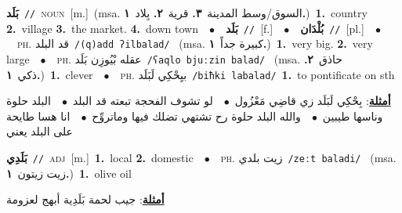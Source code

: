 \documentclass[10pt,a4paper,twoside]{article} %
\begin{document}
\begin{multicols}{2}
{\setlength\topsep{0pt}\textbf{\foreignlanguage{arabic}{بَلَد}}\ {\color{gray}\texttt{//}\color{black}}\ \textsc{noun}\ [m.]\ \color{gray}(msa. \foreignlanguage{arabic}{السوق/وسط المدينة}~\foreignlanguage{arabic}{\textbf{٣.}}  \foreignlanguage{arabic}{قرية}~\foreignlanguage{arabic}{\textbf{٢.}}  \foreignlanguage{arabic}{بِلاد}~\foreignlanguage{arabic}{\textbf{١.}})\color{black}\ \textbf{1.}~country  \textbf{2.}~village  \textbf{3.}~the market.  \textbf{4.}~down town\ \ $\bullet$\ \ \setlength\topsep{0pt}\textbf{\foreignlanguage{arabic}{بَلَد}}\ {\color{gray}\texttt{//}\color{black}}\ [f.]\ \ $\bullet$\ \ \setlength\topsep{0pt}\textbf{\foreignlanguage{arabic}{بُلْدَان}}\ {\color{gray}\texttt{//}\color{black}}\ [pl.]\ \ $\bullet$\ \ \textsc{ph.} \color{gray} \foreignlanguage{arabic}{قد البلد}\color{black}\ {\color{gray}\texttt{/{\sffamily (q)add ʔilbalad}/}\color{black}}\ \color{gray} (msa. \foreignlanguage{arabic}{كبيرة جداً}~\foreignlanguage{arabic}{\textbf{١.}})\color{black}\ \textbf{1.}~very big.  \textbf{2.}~very large\ \ $\bullet$\ \ \textsc{ph.} \color{gray} \foreignlanguage{arabic}{عقله بْيُوزِن بَلَد}\color{black}\ {\color{gray}\texttt{/{\sffamily ʕaqlo bjuːzin balad}/}\color{black}}\ \color{gray} (msa. \foreignlanguage{arabic}{حاذق}~\foreignlanguage{arabic}{\textbf{٢.}}  \foreignlanguage{arabic}{ذكي}~\foreignlanguage{arabic}{\textbf{١.}})\color{black}\ \textbf{1.}~clever\ \ $\bullet$\ \ \textsc{ph.} \color{gray} \foreignlanguage{arabic}{بيِحْكِي لَبَلَد}\color{black}\ {\color{gray}\texttt{/{\sffamily biħki labalad}/}\color{black}}\ \textbf{1.}~to pontificate on sth\  \begin{flushright}\color{gray}\foreignlanguage{arabic}{\textbf{\underline{\foreignlanguage{arabic}{أمثلة}}}: بِحْكِي لَبَلَد زي قاضِي مَعْزُول\ $\bullet$\ \  لو تشوف الفحجة تبعته قد البلد\ $\bullet$\ \  البلد حلوة وناسها طيبين\ $\bullet$\ \  والله البلد حلوة رح تشتهي تضلك فيها وماتروِّح\ $\bullet$\ \  انا هسا طايحة على البلد يعني}\end{flushright}\color{black}} \vspace{2mm}

{\setlength\topsep{0pt}\textbf{\foreignlanguage{arabic}{بَلَدِي}}\ {\color{gray}\texttt{//}\color{black}}\ \textsc{adj}\ [m.]\ \textbf{1.}~local  \textbf{2.}~domestic\ \ $\bullet$\ \ \textsc{ph.} \color{gray} \foreignlanguage{arabic}{زيت بلدي}\color{black}\ {\color{gray}\texttt{/{\sffamily zeːt baladi}/}\color{black}}\ \color{gray} (msa. \foreignlanguage{arabic}{زيت زيتون}~\foreignlanguage{arabic}{\textbf{١.}})\color{black}\ \textbf{1.}~olive oil\  \begin{flushright}\color{gray}\foreignlanguage{arabic}{\textbf{\underline{\foreignlanguage{arabic}{أمثلة}}}: جيب لحمة بَلَدِية أبهج لعزومة}\end{flushright}\color{black}} \vspace{2mm}


\end{multicols}
\end{document}
